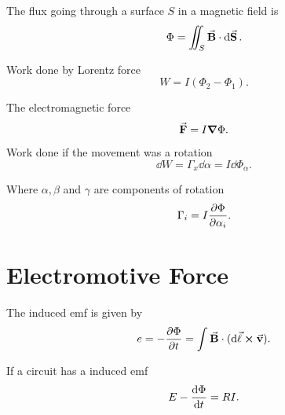 The flux going through a surface $S$ in a magnetic field is
\[
	\Phi = \iint_S \va{B}\cdot\dd{\va{S}}
	.\]

Work done by Lorentz force
\[
	W = I(\Phi_2 - \Phi_1)
	.\]

The electromagnetic force
\[
	\va{F} = I \grad{\Phi}
	.\]

Work done if the movement was a rotation
\[
	\dd{W} = \Gamma_x\dd{\alpha} = I \dd{\Phi_\alpha}
	.\]

Where $\alpha, \beta$ and $\gamma$ are components of rotation
\[
	\Gamma_i = I \pdv{\Phi}{\alpha_i}
	.\]

\section{Electromotive Force}
The induced emf is given by
\[
	e = -\pdv{\Phi}{t} = \int \va{B}\cdot(\dd{\va{\ell}}\cross\va{v})
	.\]

If a circuit has a induced emf
\[
	E-\dv{\Phi}{t} = RI
	.\]


